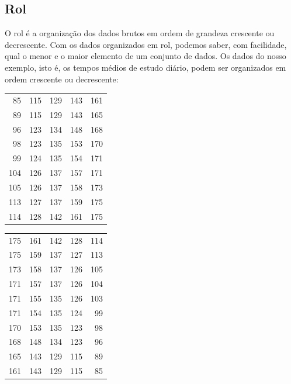 \subsection{Rol}
O rol é a organização dos dados brutos em ordem de grandeza crescente ou decrescente. Com os dados organizados em rol, podemos saber, com facilidade, qual o menor e o maior elemento de um conjunto de dados. Os dados do nosso exemplo, isto é, os tempos médios de estudo diário, podem ser organizados em ordem crescente ou decrescente:
\newline
\noindent
\begin{minipage}[t]{0.49\textwidth}
\centering
\begin{tabular}{rrrrr}
\toprule
85  &115 &129 &143 &161\\
89  &115 &129 &143 &165\\
96  &123 &134 &148 &168\\
98  &123 &135 &153 &170\\
99  &124 &135 &154 &171\\
104 &126 &137 &157 &171\\
105 &126 &137 &158 &173\\
113 &127 &137 &159 &175\\
114 &128 &142 &161 &175\\
\bottomrule
\end{tabular}
\end{minipage}\hfill
\begin{minipage}[t]{0.49\textwidth}
\centering
\begin{tabular}{rrrrr}
\toprule
175 &161 &142 &128 &114\\
175 &159 &137 &127 &113\\
173 &158 &137 &126 &105\\
171 &157 &137 &126 &104\\
171 &155 &135 &126 &103\\
171 &154 &135 &124 & 99\\
170 &153 &135 &123 & 98\\
168 &148 &134 &123 & 96\\
165 &143 &129 &115 & 89\\
161 &143 &129 &115 & 85\\
\bottomrule
\end{tabular}
\end{minipage}


